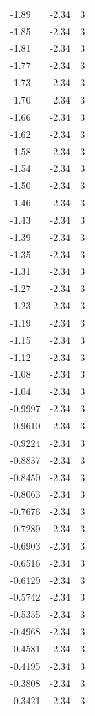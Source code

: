 \begin{longtable}{lrr}
  -1.89 & -2.34 & 3 \\
  -1.85 & -2.34 & 3 \\
  -1.81 & -2.34 & 3 \\
  -1.77 & -2.34 & 3 \\
  -1.73 & -2.34 & 3 \\
  -1.70 & -2.34 & 3 \\
  -1.66 & -2.34 & 3 \\
  -1.62 & -2.34 & 3 \\
  -1.58 & -2.34 & 3 \\
  -1.54 & -2.34 & 3 \\
  -1.50 & -2.34 & 3 \\
  -1.46 & -2.34 & 3 \\
  -1.43 & -2.34 & 3 \\
  -1.39 & -2.34 & 3 \\
  -1.35 & -2.34 & 3 \\
  -1.31 & -2.34 & 3 \\
  -1.27 & -2.34 & 3 \\
  -1.23 & -2.34 & 3 \\
  -1.19 & -2.34 & 3 \\
  -1.15 & -2.34 & 3 \\
  -1.12 & -2.34 & 3 \\
  -1.08 & -2.34 & 3 \\
  -1.04 & -2.34 & 3 \\
  -0.9997 & -2.34 & 3 \\
  -0.9610 & -2.34 & 3 \\
  -0.9224 & -2.34 & 3 \\
  -0.8837 & -2.34 & 3 \\
  -0.8450 & -2.34 & 3 \\
  -0.8063 & -2.34 & 3 \\
  -0.7676 & -2.34 & 3 \\
  -0.7289 & -2.34 & 3 \\
  -0.6903 & -2.34 & 3 \\
  -0.6516 & -2.34 & 3 \\
  -0.6129 & -2.34 & 3 \\
  -0.5742 & -2.34 & 3 \\
  -0.5355 & -2.34 & 3 \\
  -0.4968 & -2.34 & 3 \\
  -0.4581 & -2.34 & 3 \\
  -0.4195 & -2.34 & 3 \\
  -0.3808 & -2.34 & 3 \\
  -0.3421 & -2.34 & 3 \\

\end{longtable}
